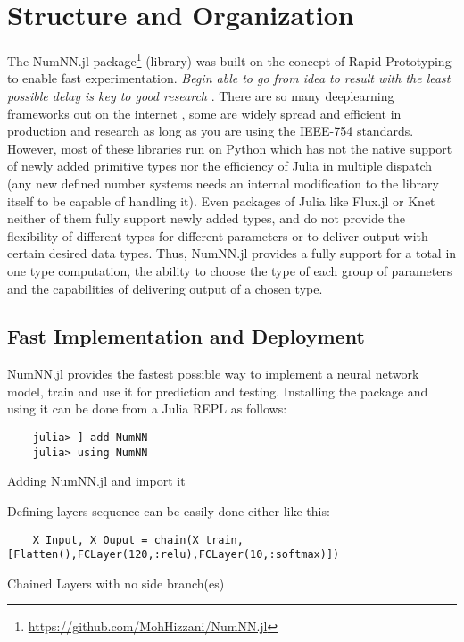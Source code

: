\section{Structure and Organization}

The NumNN.jl  package\footnote{\href{https://github.com/MohHizzani/NumNN.jl}{https://github.com/MohHizzani/NumNN.jl}} (library) was built on the concept of Rapid Prototyping to enable fast experimentation. \emph{Begin able to go from idea to result with the least possible delay is key to good research} \cite{Keras}. There are so many deeplearning frameworks out on the internet \cite{Abadi2016,Collet2015,Jia2014,Paszke2017,PyTorch2019}, some are widely spread and efficient in production and research as long as you are using the IEEE-754 standards. However, most of these libraries run on Python which has not the native support of newly added primitive types nor the efficiency of Julia in multiple dispatch (any new defined number systems needs an internal modification to the library itself to be capable of handling it). Even packages of Julia like Flux.jl \cite{Flux.jl-2018,Innes2018} or Knet \cite{Yuret2016k} neither of them fully support newly added types, and do not provide the flexibility of different types for different parameters or to deliver output with certain desired data types. Thus, NumNN.jl provides a fully support for a total in one type computation, the ability to choose the type of each group of parameters and the capabilities of delivering output of a chosen type.

\subsection{Fast Implementation and Deployment}

NumNN.jl provides the fastest possible way to implement a neural network model, train and use it for prediction and testing. Installing the package and using it can be done from a Julia REPL as follows:

\begin{listing}[H]
	\begin{verbatim}
	julia> ] add NumNN
	julia> using NumNN
	\end{verbatim}
	\caption{Adding NumNN.jl and import it}\label{addimport}
\end{listing}

Defining layers sequence can be easily done either like this:

\begin{listing}[H]
	\begin{verbatim}
	X_Input, X_Ouput = chain(X_train,[Flatten(),FCLayer(120,:relu),FCLayer(10,:softmax)])
	\end{verbatim}
	\caption{Chained Layers with no side branch(es)}\label{chain}
\end{listing}


